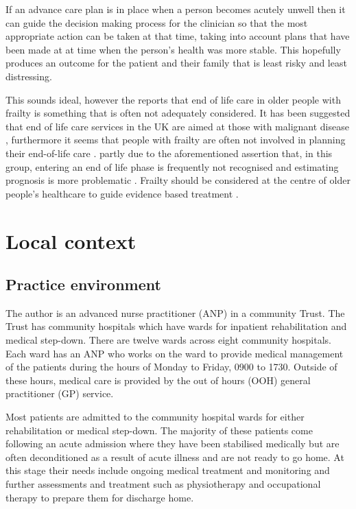 \documentclass
[
	12pt,
	a4paper,
	oneside,
]{report}
\begin{document}
If an advance care plan is in place when a person becomes acutely unwell then it
can guide the decision making process for the clinician so that the most appropriate
action can be taken at that time, taking into account plans that have been made 
at at time when the person's health was more stable. This hopefully produces an
outcome for the patient and their family that is least risky and least distressing.

This sounds ideal, however the \textcite{silver:12} reports that end of life care 
in older people with frailty
is something that is often not adequately considered. It has been suggested that 
end of life care services in the UK are aimed at those with malignant 
disease \parencite{sharp:13}, furthermore it seems that people with frailty 
are often not involved in planning their 
end-of-life care \textcite{oliver:14}. partly due to the aforementioned assertion 
that, in this group, entering an end of life phase is frequently not recognised 
\textcite{wallington:16} and
estimating prognosis is more problematic \parencite{silver:12}.
Frailty should be considered at the centre of older people's healthcare to guide
evidence based treatment \parencite{woo:14}.

\section{Local context}

\subsection{Practice environment}
\label{sec:local-practice}
The author is an advanced nurse practitioner (ANP) in a community Trust.
The Trust has community hospitals which have wards for inpatient rehabilitation and
medical step-down. There are twelve wards across eight community hospitals. Each ward has
an ANP who works on the ward to provide medical management of the patients during 
the hours of Monday to Friday, 0900 to 1730. Outside of these hours, medical care 
is provided by the out of hours (OOH) general practitioner (GP) service. 

Most patients are admitted to the community hospital wards for either rehabilitation
or medical step-down. The majority of these patients come following an acute admission
where they have been stabilised medically but are often deconditioned as a result
of acute illness and are not ready to go home. At this stage their needs include 
ongoing medical treatment and monitoring and further assessments and treatment such 
as physiotherapy and occupational therapy to prepare them for discharge home.
\end{document}
